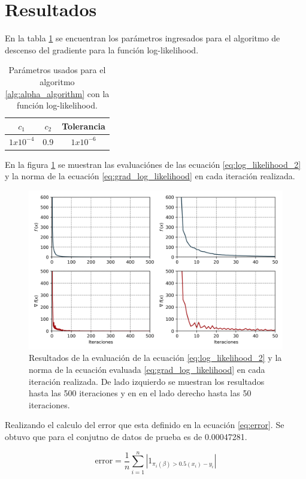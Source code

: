 \section{Resultados}

En la tabla \ref{table:parameters} se encuentran los parámetros ingresados para el algoritmo de descenso del gradiente para la función log-likelihood.

\begin{table}[H]
    \centering
    \begin{tabular}{ccc} \hline
        $c_1$       & $c_2$ & Tolerancia  \\   \hline
        $1x10^{-4}$ & 0.9   & $1x10^{-6}$ \\ \hline
    \end{tabular}
    \caption{Parámetros usados para el algoritmo \ref{alg:alpha_algorithm} con la función log-likelihood.}
    \label{table:parameters}
\end{table}

En la figura \ref{fig:log_likelihood} se muestran las evaluaciónes de las ecuación \ref{eq:log_likelihood_2} y la norma de la ecuación \ref{eq:grad_log_likelihood} en cada iteración realizada.

\begin{figure}[H]
    \centering
    \includegraphics[width=14cm]{Graphics/log_likelihood_bisection.png}
    \caption{Resultados de la evaluación de la ecuación \ref{eq:log_likelihood_2} y la norma de la ecuación evaluada \ref{eq:grad_log_likelihood} en cada iteración realizada. De lado izquierdo se muestran los resultados hasta las 500 iteraciones y en en el lado derecho hasta las 50 iteraciones.}
    \label{fig:log_likelihood}
\end{figure}

Realizando el calculo del error que esta definido en la ecuación \ref{eq:error}. Se obtuvo que para el conjutno de datos de prueba es de 0.00047281.

\begin{equation}
    \text{error} = \frac{1}{n} \sum_{i=1}^n\left| 1_{\pi_i(\beta)>0.5(x_i)-y_i}\right|
    \label{eq:error}
\end{equation}